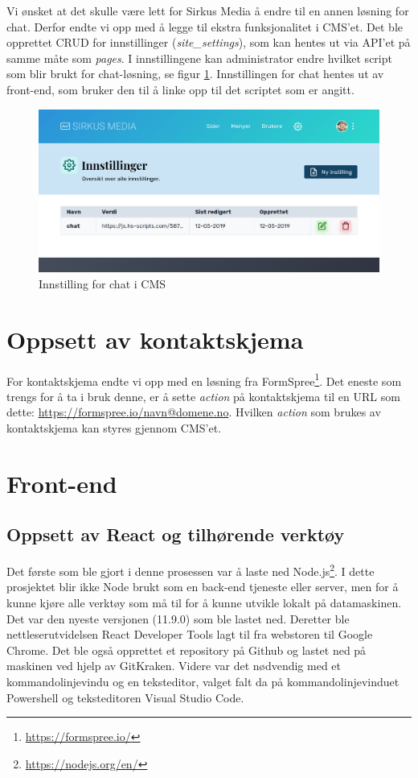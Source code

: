 Vi ønsket at det skulle være lett for Sirkus Media å endre til en annen løsning for chat. Derfor endte vi opp med å legge til ekstra funksjonalitet i CMS'et. Det ble opprettet CRUD for innstillinger (\textit{site\_settings}), som kan hentes ut via API'et på samme måte som \textit{pages}. I innstillingene kan administrator endre hvilket script som blir brukt for chat-løsning, se figur \ref{fig:chat-setting}. Innstillingen for chat hentes ut av front-end, som bruker den til å linke opp til det scriptet som er angitt.
\begin{figure}[H]
    \centering
    \includegraphics[width=\textwidth]{bjornar/chat-setting.png}
    \caption{Innstilling for chat i CMS}
    \label{fig:chat-setting}
\end{figure}

\section{Oppsett av kontaktskjema}
For kontaktskjema endte vi opp med en løsning fra FormSpree\footnote{\url{https://formspree.io/}}. Det eneste som trengs for å ta i bruk denne, er å sette \textit{action} på kontaktskjema til en URL som dette: \url{https://formspree.io/navn@domene.no}. Hvilken \textit{action} som brukes av kontaktskjema kan styres gjennom CMS'et.

\section{Front-end}
\subsection{Oppsett av React og tilhørende verktøy}

Det første som ble gjort i denne prosessen var å laste ned Node.js\footnote{\url{https://nodejs.org/en/}}. I dette prosjektet blir ikke Node brukt som en back-end tjeneste eller server, men for å kunne kjøre alle verktøy som må til for å kunne utvikle lokalt på datamaskinen. Det var den nyeste versjonen (11.9.0) som ble lastet ned. Deretter ble nettleserutvidelsen React Developer Tools lagt til fra  webstoren til Google Chrome. Det ble også opprettet et repository på Github og lastet ned på maskinen ved hjelp av GitKraken. 
Videre var det nødvendig med et kommandolinjevindu og en teksteditor, valget falt da på kommandolinjevinduet Powershell og teksteditoren Visual Studio Code.

